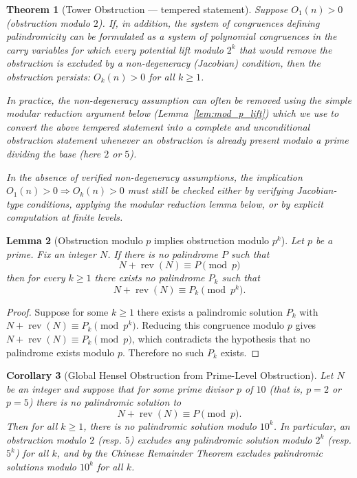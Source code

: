 \documentclass[12pt,a4paper]{article}
\newtheorem{theorem}{Theorem}[section]
\newtheorem{lemma}[theorem]{Lemma}
\newtheorem{corollary}[theorem]{Corollary}
\begin{document}
\begin{theorem}[Tower Obstruction --- tempered statement]\label{thm:tower-9}
Suppose $O_1(n) > 0$ (obstruction modulo $2$). If, in addition, the system of congruences defining palindromicity can be formulated as a system of polynomial congruences in the carry variables for which every potential lift modulo $2^k$ that would remove the obstruction is excluded by a non-degeneracy (Jacobian) condition, then the obstruction persists: $O_k(n) > 0$ for all $k \ge 1$.

In practice, the non-degeneracy assumption can often be removed using the simple modular reduction argument below (Lemma~\ref{lem:mod_p_lift}) which we use to convert the above tempered statement into a complete and unconditional obstruction statement whenever an obstruction is already present modulo a prime dividing the base (here $2$ or $5$).

In the absence of verified non-degeneracy assumptions, the implication $O_1(n) > 0 \Rightarrow O_k(n) > 0$ must still be checked either by verifying Jacobian-type conditions, applying the modular reduction lemma below, or by explicit computation at finite levels.
\end{theorem}


\begin{lemma}[Obstruction modulo $p$ implies obstruction modulo $p^k$]
Let $p$ be a prime. Fix an integer $N$. If there is no palindrome $P$ such that
$$N+\operatorname{rev}(N)\equiv P\pmod p$$
then for every $k\ge1$ there exists no palindrome $P_k$ such that
$$N+\operatorname{rev}(N)\equiv P_k\pmod{p^k}.$$
\end{lemma}

\begin{proof}
Suppose for some $k\ge1$ there exists a palindromic solution $P_k$ with
$N+\operatorname{rev}(N)\equiv P_k\pmod{p^k}$. Reducing this congruence modulo $p$ gives
$N+\operatorname{rev}(N)\equiv P_k\pmod p$, which contradicts the hypothesis that no palindrome exists modulo $p$. Therefore no such $P_k$ exists.
\end{proof}

\begin{corollary}[Global Hensel Obstruction from Prime-Level Obstruction]\label{cor:prime_to_power-9}
Let $N$ be an integer and suppose that for some prime divisor $p$ of $10$ (that is, $p = 2$ or $p = 5$) there is no palindromic solution to
\[
N + \operatorname{rev}(N) \equiv P \pmod p.
\]
Then for all $k \ge 1$, there is no palindromic solution modulo $10^k$. In particular, an obstruction modulo $2$ (resp. $5$) excludes any palindromic solution modulo $2^k$ (resp. $5^k$) for all $k$, and by the Chinese Remainder Theorem excludes palindromic solutions modulo $10^k$ for all $k$.
\end{corollary}
\end{document}
